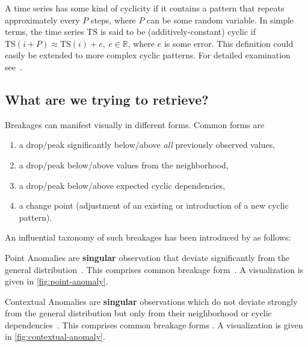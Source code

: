 \begin{definition}[Cyclicity]\label{def:cyclicity}
    A time series has some kind of cyclicity if it contains a pattern that repeats
    approximately every \(P\) steps, where \(P\) can be some random variable. In
    simple terms, the time series TS is said to be (additively-constant) cyclic
    if \(\text{TS}(i + P) \approx \text{TS}(i) + e,\ e\in \mathbb{R}\), where \(e\)
    is some error. This definition could easily be extended to more complex cyclic
    patterns. For detailed examination see~\cite{Falk.2012}.
\end{definition}

\subsection{What are we trying to retrieve?}
Breakages can manifest visually in different forms. Common forms are
\begin{enumerate}
    \item\label{itm:1} a drop/peak significantly below/above \textit{all} previously observed values,
    \item\label{itm:2} a drop/peak below/above values from the neighborhood,
    \item\label{itm:3} a drop/peak below/above expected cyclic dependencies,
    \item\label{itm:4} a change point (adjustment of an existing or introduction of a new cyclic pattern).
\end{enumerate}
An influential taxonomy of such breakages has been introduced by \textcite{Chandola.2009}
as follows:

\begin{definition}\label{def:point-anomaly}
    Point Anomalies are \textbf{singular} observation that deviate significantly
    from the general distribution~\cite[cf.][]{Chandola.2009}. This comprises
    common breakage form~. A visualization is given in
    \cref{fig:point-anomaly}.
\end{definition}

\begin{definition}\label{def:contextual-anomaly}
    Contextual Anomalies are \textbf{singular} observations which do not deviate
    strongly from the general distribution but only from their neighborhood or
    cyclic dependencies~\cite[cf.][]{Chandola.2009}. This comprises common breakage
    forms . A visualization is given in
    \cref{fig:contextual-anomaly}.
\end{definition}
 
